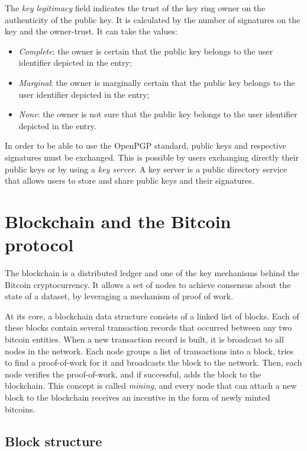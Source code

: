 The \textit{key legitimacy} field indicates the trust of the key ring owner on the authenticity of the public key.
It is calculated by the number of signatures on the key and the owner-trust.
It can take the values:
\begin{itemize}
	\item \textit{Complete}: the owner is certain that the public key belongs to the user identifier depicted in the entry;
	\item \textit{Marginal}: the owner is marginally certain that the public key belongs to the user identifier depicted in the entry;
	\item \textit{None}: the owner is not sure that the public key belongs to the user identifier depicted in the entry.
\end{itemize}

In order to be able to use the OpenPGP standard, public keys and respective signatures must be exchanged.
This is possible by users exchanging directly their public keys or by using a \textit{key server}.
A key server is a public directory service that allows users to store and share public keys and their signatures.

\section{Blockchain and the Bitcoin protocol}
The blockchain is a distributed ledger and one of the key mechanisms behind the
Bitcoin\cite{Nakamoto2008} cryptocurrency.
It allows a set of nodes to achieve consensus about the state of a dataset, by
leveraging a mechanism of proof of work.

At its core, a blockchain data structure consists of a linked list of blocks.
Each of these blocks contain several transaction records that occurred between any two bitcoin entities.
When a new transaction record is built, it is broadcast to all nodes in the network.
Each node groups a list of transactions into a block, tries to find a
proof-of-work for it and broadcasts the block to the network.
Then, each node verifies the proof-of-work, and if successful, adds the block to the blockchain.
This concept is called \textit{mining}, and every node that can attach a new block to the blockchain receives an incentive in the form of newly minted bitcoins.

\subsection{Block structure}

